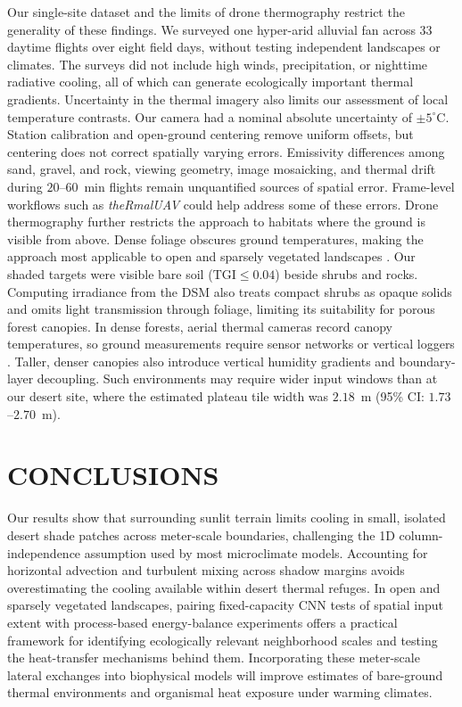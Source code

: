 \documentclass[12pt]{article}
\begin{document}
Our single-site dataset and the limits of drone thermography restrict the generality of these findings. We surveyed one hyper-arid alluvial fan across 33 daytime flights over eight field days, without testing independent landscapes or climates. The surveys did not include high winds, precipitation, or nighttime radiative cooling, all of which can generate ecologically important thermal gradients.
Uncertainty in the thermal imagery also limits our assessment of local temperature contrasts. Our camera had a nominal absolute uncertainty of $\pm 5^\circ\mathrm{C}$. Station calibration and open-ground centering remove uniform offsets, but centering does not correct spatially varying errors. Emissivity differences among sand, gravel, and rock, viewing geometry, image mosaicking, and thermal drift during $20$--$60$~min flights remain unquantified sources of spatial error. Frame-level workflows such as \textit{theRmalUAV} \citep{Metsu2026} could help address some of these errors.
Drone thermography further restricts the approach to habitats where the ground is visible from above. Dense foliage obscures ground temperatures, making the approach most applicable to open and sparsely vegetated landscapes \citep{Itzkovitch2025}. Our shaded targets were visible bare soil ($\text{TGI} \le 0.04$) beside shrubs and rocks. Computing irradiance from the DSM also treats compact shrubs as opaque solids and omits light transmission through foliage, limiting its suitability for porous forest canopies. In dense forests, aerial thermal cameras record canopy temperatures, so ground measurements require sensor networks or vertical loggers \citep{gril_2023, Itzkovitch2025}. Taller, denser canopies also introduce vertical humidity gradients and boundary-layer decoupling. Such environments may require wider input windows than at our desert site, where the estimated plateau tile width was $2.18$~m (95\% CI: $1.73$--$2.70$~m).

\section{CONCLUSIONS}
\noindent
Our results show that surrounding sunlit terrain limits cooling in small, isolated desert shade patches across meter-scale boundaries, challenging the 1D column-independence assumption used by most microclimate models. Accounting for horizontal advection and turbulent mixing across shadow margins avoids overestimating the cooling available within desert thermal refuges. In open and sparsely vegetated landscapes, pairing fixed-capacity CNN tests of spatial input extent with process-based energy-balance experiments offers a practical framework for identifying ecologically relevant neighborhood scales and testing the heat-transfer mechanisms behind them. Incorporating these meter-scale lateral exchanges into biophysical models will improve estimates of bare-ground thermal environments and organismal heat exposure under warming climates.
\end{document}
